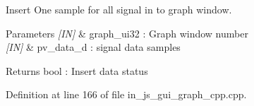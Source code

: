 Insert One sample for all signal in to graph window. 


\begin{DoxyParams}{Parameters}
{\em \mbox{[}\+I\+N\mbox{]}} & graph\+\_\+ui32 \+: Graph window number \\
\hline
{\em \mbox{[}\+I\+N\mbox{]}} & pv\+\_\+data\+\_\+d \+: signal data samples \\
\hline
\end{DoxyParams}
\begin{DoxyReturn}{Returns}
bool \+: Insert data status 
\end{DoxyReturn}


Definition at line 166 of file in\+\_\+js\+\_\+gui\+\_\+graph\+\_\+cpp.\+cpp.

